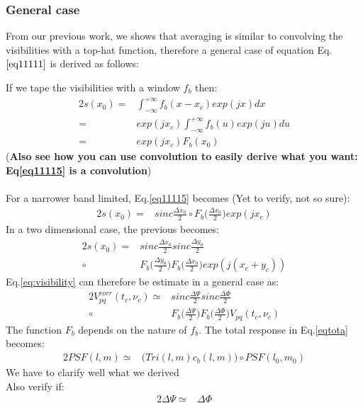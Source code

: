 \subsubsection{General case}
From our previous work, we shows that averaging is similar to convolving the visibilities with a top-hat function, therefore a general 
case of equation Eq. $\ref{eq11111}$ is derived as follows:

If we tape the visibilities with a window $f_b$ then:
\begin{alignat}{2}
s(x_0) =& \int_{-\infty}^{+\infty}f_{b}(x-x_c)exp(jx)dx \\
        =& exp(jx_c)\int_{-\infty}^{+\infty}f_{b}(u)exp(ju)du\\
        =& exp(jx_c)F_b(x_0)\label{eq11115}
\end{alignat}
(\textbf{Also see how you can use convolution to easily derive what you want: Eq\ref{eq11115} is a convolution})\\
\\
For a narrower band limited, Eq.\ref{eq11115}  becomes (Yet to verify, not so sure):
\begin{alignat}{2}
s(x_0)=&  sinc\frac{\Delta x_0}{2}\circ F_{b}\bigg(\frac{\Delta x_0}{2}\bigg)exp(j x_c)
\end{alignat}
In a two dimensional case, the previous becomes:
\begin{alignat}{2}
s(x_0)=&  sinc\frac{\Delta x_0}{2}sinc\frac{\Delta y_0}{2}\\
      \circ& F_{b}\bigg(\frac{\Delta y_0}{2}\bigg)F_{b}\bigg(\frac{\Delta 
x_0}{2}\bigg)exp(j (x_c+y_c))
\end{alignat}
Eq.\ref{eq:visibility} can therefore be estimate in a general case as:
\begin{alignat}{2}
 V_{pq}^{corr}(t_c, \nu_c)\simeq&sinc\frac{\Delta \Psi}{2}sinc\frac{\Delta \Phi}{2}\\
			  \circ&F_{b}\bigg(\frac{\Delta\Psi}{2}\bigg)F_{b}\bigg(\frac{\Delta \Phi}{2}\bigg) V_{pq}(t_{c},\nu_{c})
\end{alignat}
The function $F_b$ depends on the nature of $f_b$. The total response in Eq.\ref{eqtota} becomes:
\begin{alignat}{2}
PSF(l,m)\simeq&  \bigg(Tri(l,m)c_b(l,m)\bigg)\circ PSF(l_0,m_0)
\end{alignat}
We have to clarify well what we derived\\
Also verify if:
\begin{alignat}{2}
\Delta \Psi\simeq& \Delta \Phi
\end{alignat}

